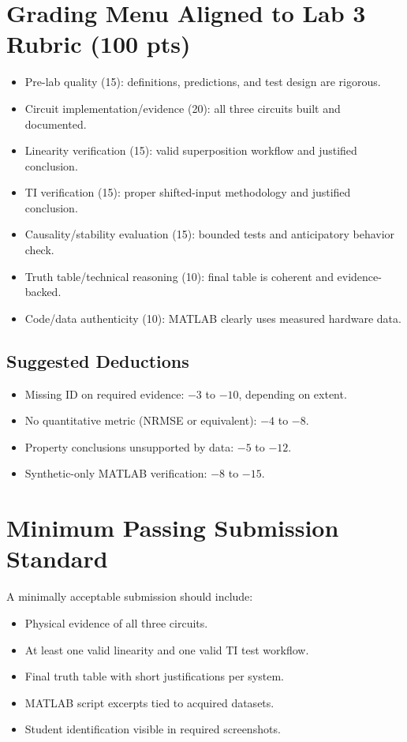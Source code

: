 \documentclass[11pt,letterpaper]{article}
\begin{document}
\section{Grading Menu Aligned to Lab 3 Rubric (100 pts)}
\begin{itemize}[leftmargin=1.2em]
    \item Pre-lab quality (15): definitions, predictions, and test design are rigorous.
    \item Circuit implementation/evidence (20): all three circuits built and documented.
    \item Linearity verification (15): valid superposition workflow and justified conclusion.
    \item TI verification (15): proper shifted-input methodology and justified conclusion.
    \item Causality/stability evaluation (15): bounded tests and anticipatory behavior check.
    \item Truth table/technical reasoning (10): final table is coherent and evidence-backed.
    \item Code/data authenticity (10): MATLAB clearly uses measured hardware data.
\end{itemize}

\subsection*{Suggested Deductions}
\begin{itemize}[leftmargin=1.2em]
    \item Missing ID on required evidence: \(-3\) to \(-10\), depending on extent.
    \item No quantitative metric (NRMSE or equivalent): \(-4\) to \(-8\).
    \item Property conclusions unsupported by data: \(-5\) to \(-12\).
    \item Synthetic-only MATLAB verification: \(-8\) to \(-15\).
\end{itemize}

\section{Minimum Passing Submission Standard}
A minimally acceptable submission should include:
\begin{itemize}[leftmargin=1.2em]
    \item Physical evidence of all three circuits.
    \item At least one valid linearity and one valid TI test workflow.
    \item Final truth table with short justifications per system.
    \item MATLAB script excerpts tied to acquired datasets.
    \item Student identification visible in required screenshots.
\end{itemize}
\end{document}
